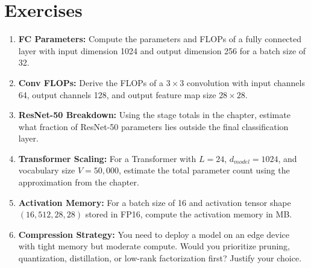 \section{Exercises}

\begin{enumerate}
    \item \textbf{FC Parameters:} Compute the parameters and FLOPs of a fully connected layer with input dimension 1024 and output dimension 256 for a batch size of 32.

    \item \textbf{Conv FLOPs:} Derive the FLOPs of a $3\times3$ convolution with input channels 64, output channels 128, and output feature map size $28\times28$.

    \item \textbf{ResNet-50 Breakdown:} Using the stage totals in the chapter, estimate what fraction of ResNet-50 parameters lies outside the final classification layer.

    \item \textbf{Transformer Scaling:} For a Transformer with $L=24$, $d_{model}=1024$, and vocabulary size $V=50{,}000$, estimate the total parameter count using the approximation from the chapter.

    \item \textbf{Activation Memory:} For a batch size of 16 and activation tensor shape $(16, 512, 28, 28)$ stored in FP16, compute the activation memory in MB.

    \item \textbf{Compression Strategy:} You need to deploy a model on an edge device with tight memory but moderate compute. Would you prioritize pruning, quantization, distillation, or low-rank factorization first? Justify your choice.
\end{enumerate}

